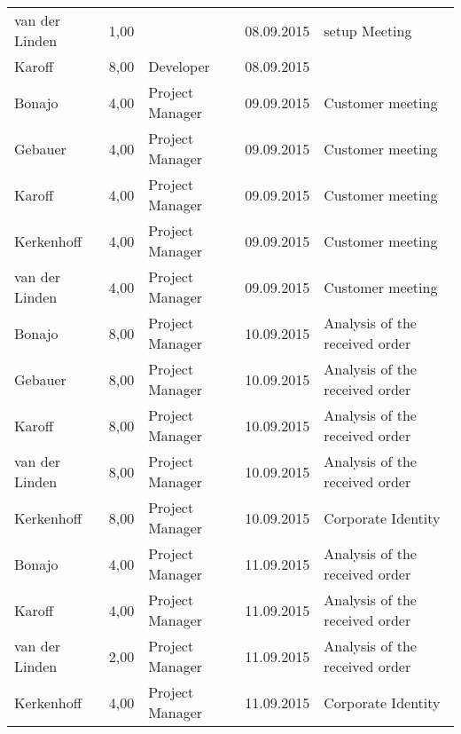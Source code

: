 \begin{longtable}{ l r p{2cm} c p{4cm} }
		van der Linden          & 1,00           &                 & 08.09.2015    & setup Meeting                                \\
		Karoff                  & 8,00           & Developer       & 08.09.2015    &                                              \\
		Bonajo                  & 4,00           & Project Manager & 09.09.2015    & Customer meeting                              \\
		Gebauer                 & 4,00           & Project Manager & 09.09.2015    & Customer meeting                              \\
		Karoff                  & 4,00           & Project Manager & 09.09.2015    & Customer meeting                              \\
		Kerkenhoff              & 4,00           & Project Manager & 09.09.2015    & Customer meeting                              \\
		van der Linden          & 4,00           & Project Manager & 09.09.2015    & Customer meeting                              \\
		Bonajo                  & 8,00           & Project Manager & 10.09.2015    & Analysis of the received order               \\
		Gebauer                 & 8,00           & Project Manager & 10.09.2015    & Analysis of the received order               \\
		Karoff                  & 8,00           & Project Manager & 10.09.2015    & Analysis of the received order               \\
		van der Linden          & 8,00           & Project Manager & 10.09.2015    & Analysis of the received order               \\
		Kerkenhoff              & 8,00           & Project Manager & 10.09.2015    & Corporate Identity                           \\
		Bonajo                  & 4,00           & Project Manager & 11.09.2015    & Analysis of the received order               \\
		Karoff                  & 4,00           & Project Manager & 11.09.2015    & Analysis of the received order               \\
		van der Linden          & 2,00           & Project Manager & 11.09.2015    & Analysis of the received order               \\
		Kerkenhoff              & 4,00           & Project Manager & 11.09.2015    & Corporate Identity                           \\

\end{longtable}
